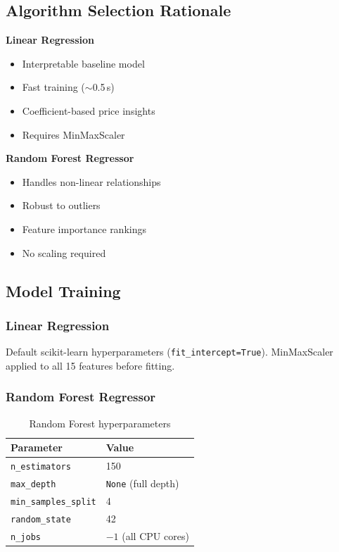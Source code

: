 \documentclass[12pt,a4paper]{article}
\newcommand{\TH}[1]{\cellcolor{TblHead}\color{white}\sffamily\bfseries\small #1}
\newcommand{\RA}{\cellcolor{RowA}}
\newcommand{\RB}{\cellcolor{RowB}}
\begin{document}
\subsection{Algorithm Selection Rationale}
\begin{minipage}[t]{0.47\textwidth}
  \textbf{\color{Steel}Linear Regression}
  \begin{itemize}
    \item Interpretable baseline model
    \item Fast training ($\sim$0.5\,s)
    \item Coefficient-based price insights
    \item Requires MinMaxScaler
  \end{itemize}
\end{minipage}\hfill
\begin{minipage}[t]{0.47\textwidth}
  \textbf{\color{Steel}Random Forest Regressor}
  \begin{itemize}
    \item Handles non-linear relationships
    \item Robust to outliers
    \item Feature importance rankings
    \item No scaling required
  \end{itemize}
\end{minipage}

\subsection{Model Training}

\subsubsection{Linear Regression}
Default scikit-learn hyperparameters (\texttt{fit\_intercept=True}).
MinMaxScaler applied to all 15 features before fitting.

\subsubsection{Random Forest Regressor}
\begin{table}[H]\centering
  \caption{Random Forest hyperparameters}
  \begin{tabular}{ll}
    \toprule\TH{Parameter} & \TH{Value}\\\midrule
    \RA\texttt{n\_estimators}       & 150 \\
    \RB\texttt{max\_depth}          & \texttt{None} (full depth) \\
    \RA\texttt{min\_samples\_split} & 4 \\
    \RB\texttt{random\_state}       & 42 \\
    \RA\texttt{n\_jobs}             & $-1$ (all CPU cores) \\
    \bottomrule
  \end{tabular}
\end{table}
\end{document}
